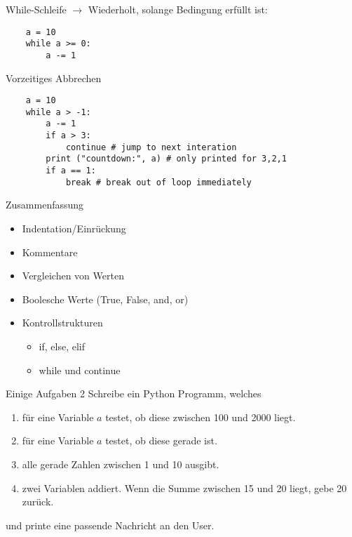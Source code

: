 \begin{frame}[fragile]{While-Schleife}
    $\rightarrow$ Wiederholt, solange Bedingung erfüllt ist:
    \begin{lstlisting}
    a = 10
    while a >= 0:
        a -= 1
    \end{lstlisting}
\end{frame}

\begin{frame}[fragile]{Vorzeitiges Abbrechen} 
    \begin{lstlisting}
    a = 10
    while a > -1:
        a -= 1
        if a > 3:
            continue # jump to next interation
        print ("countdown:", a) # only printed for 3,2,1
        if a == 1:
            break # break out of loop immediately
    \end{lstlisting}
\end{frame}

\begin{frame}{Zusammenfassung}
	\begin{itemize}
		\item Indentation/Einrückung
		\item Kommentare
		\item Vergleichen von Werten
		\item Boolesche Werte (True, False, and, or)
		\item Kontrollstrukturen
		\begin{itemize}
			\item if, else, elif
			\item while und continue
		\end{itemize}
	\end{itemize}
\end{frame}

\begin{frame}{Einige Aufgaben 2}
	Schreibe ein Python Programm, welches
	\begin{enumerate}
		\item für eine Variable $a$ testet, ob diese zwischen 100 und 2000 liegt.
		\item für eine Variable $a$ testet, ob diese gerade ist.
		\item alle gerade Zahlen zwischen 1 und 10 ausgibt.
		\item zwei Variablen addiert. Wenn die Summe zwischen 15 und 20 liegt, gebe 20 zurück.
	\end{enumerate}
	und printe eine passende Nachricht an den User.
\end{frame}


